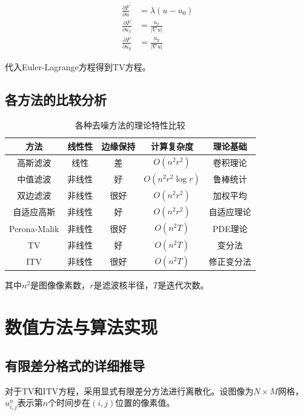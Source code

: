\documentclass[a4paper,12pt]{ctexart}
\begin{document}
\begin{align}
\frac{\partial F}{\partial u} &= \lambda(u-u_0) \\
\frac{\partial F}{\partial u_x} &= \frac{u_x}{|\nabla u|} \\
\frac{\partial F}{\partial u_y} &= \frac{u_y}{|\nabla u|}
\end{align}

代入Euler-Lagrange方程得到TV方程。

\subsection{各方法的比较分析}

\begin{table}[H]
\centering
\caption{各种去噪方法的理论特性比较}
\begin{tabular}{|c|c|c|c|c|}
\hline
\textbf{方法} & \textbf{线性性} & \textbf{边缘保持} & \textbf{计算复杂度} & \textbf{理论基础} \\
\hline
高斯滤波 & 线性 & 差 & $O(n^2 r^2)$ & 卷积理论 \\
\hline
中值滤波 & 非线性 & 好 & $O(n^2 r^2 \log r)$ & 鲁棒统计 \\
\hline
双边滤波 & 非线性 & 很好 & $O(n^2 r^2)$ & 加权平均 \\
\hline
自适应高斯 & 非线性 & 好 & $O(n^2 r^2)$ & 自适应理论 \\
\hline
Perona-Malik & 非线性 & 很好 & $O(n^2 T)$ & PDE理论 \\
\hline
TV & 非线性 & 好 & $O(n^2 T)$ & 变分法 \\
\hline
ITV & 非线性 & 很好 & $O(n^2 T)$ & 修正变分法 \\
\hline
\end{tabular}
\end{table}

其中$n^2$是图像像素数，$r$是滤波核半径，$T$是迭代次数。

\section{数值方法与算法实现}

\subsection{有限差分格式的详细推导}

对于TV和ITV方程，采用显式有限差分方法进行离散化。设图像为$N \times M$网格，$u_{i,j}^n$表示第$n$个时间步在$(i,j)$位置的像素值。
\end{document}
